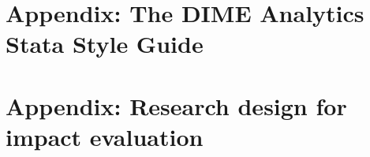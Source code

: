 


\chapter{Appendix: The DIME Analytics Stata Style Guide}
\label{ap:1}





\chapter{Appendix: Research design for impact evaluation}
\label{ap:1}




\backmatter




\printindex %


